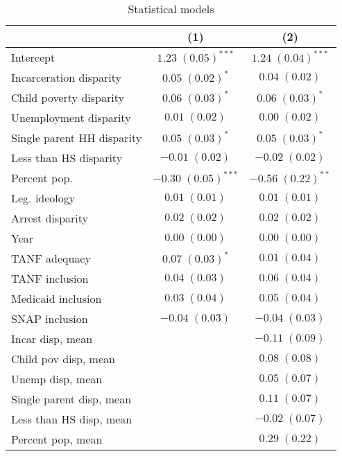 
\begin{table}
\caption{Statistical models}
\begin{center}
\begin{tabular}{l c c }
\hline
 & (1) & (2) \\
\hline
Intercept                  & $1.23 \; (0.05)^{***}$  & $1.24 \; (0.04)^{***}$ \\
Incarceration disparity    & $0.05 \; (0.02)^{*}$    & $0.04 \; (0.02)$       \\
Child poverty disparity    & $0.06 \; (0.03)^{*}$    & $0.06 \; (0.03)^{*}$   \\
Unemployment disparity     & $0.01 \; (0.02)$        & $0.00 \; (0.02)$       \\
Single parent HH disparity & $0.05 \; (0.03)^{*}$    & $0.05 \; (0.03)^{*}$   \\
Less than HS disparity     & $-0.01 \; (0.02)$       & $-0.02 \; (0.02)$      \\
Percent pop.               & $-0.30 \; (0.05)^{***}$ & $-0.56 \; (0.22)^{**}$ \\
Leg. ideology              & $0.01 \; (0.01)$        & $0.01 \; (0.01)$       \\
Arrest disparity           & $0.02 \; (0.02)$        & $0.02 \; (0.02)$       \\
Year                       & $0.00 \; (0.00)$        & $0.00 \; (0.00)$       \\
TANF adequacy              & $0.07 \; (0.03)^{*}$    & $0.01 \; (0.04)$       \\
TANF inclusion             & $0.04 \; (0.03)$        & $0.06 \; (0.04)$       \\
Medicaid inclusion         & $0.03 \; (0.04)$        & $0.05 \; (0.04)$       \\
SNAP inclusion             & $-0.04 \; (0.03)$       & $-0.04 \; (0.03)$      \\
Incar disp, mean           &                         & $-0.11 \; (0.09)$      \\
Child pov disp, mean       &                         & $0.08 \; (0.08)$       \\
Unemp disp, mean           &                         & $0.05 \; (0.07)$       \\
Single parent disp, mean   &                         & $0.11 \; (0.07)$       \\
Less than HS disp, mean    &                         & $-0.02 \; (0.07)$      \\
Percent pop, mean          &                         & $0.29 \; (0.22)$       \\

\end{tabular}
\end{center}
\end{table}
